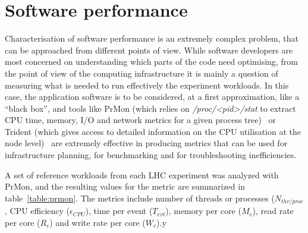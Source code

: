 \section{Software performance}
Characterisation of software performance is an extremely complex
problem, that can be approached from different points of view. While
software developers are most concerned on understanding which parts of
the code need optimising, from the point of view of the computing
infrastructure it is mainly a question of measuring what is needed to
run effectively the experiment workloads. In this case, the
application software is to be considered, at a first approximation,
like a ``black box'', and tools like PrMon (which relies on
\emph{/proc/<pid>/stat} to extract CPU time, memory, I/O and network
metrics for a given process tree)~\cite{prmon} or Trident (which gives
access to detailed information on the CPU utilisation at the node
level)~\cite{trident} are extremely effective in producing metrics
that can be used for infrastructure planning, for benchmarking and for
troubleshooting inefficiencies.

A set of reference workloads from each LHC experiment was analyzed
with PrMon, and the resulting values for the metric are summarized in table~\ref{table:prmon}. The metrics include number of threads or processes ($N_{thr/proc}$, CPU efficiency ($\epsilon_{CPU}$), time per event ($T_{evt}$), memory per core ($M_c$), read rate per core ($R_c$) and write rate per core ($W_c$).y

